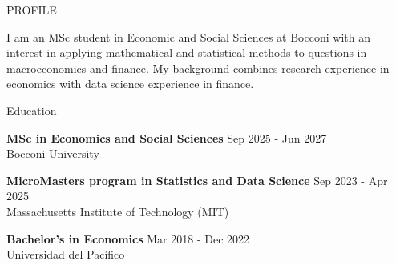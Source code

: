 \documentclass{resume} %
\begin{document}
\begin{rSection}{PROFILE}

{I am an MSc student in Economic and Social Sciences at Bocconi with an interest in applying mathematical and statistical methods to questions in macroeconomics and finance. My background combines research experience in economics with data science experience in finance.}


\end{rSection}


\begin{rSection}{Education}

{\bf MSc in Economics and Social Sciences} \hfill {Sep 2025 - Jun 2027}
\\
Bocconi University

{\bf MicroMasters program in Statistics and Data Science} \hfill {Sep 2023 - Apr 2025}
\\
Massachusetts Institute of Technology (MIT)

{\bf Bachelor's in Economics} \hfill {Mar 2018 - Dec 2022}
\\
Universidad del Pacífico 


\end{rSection}


\end{document}

